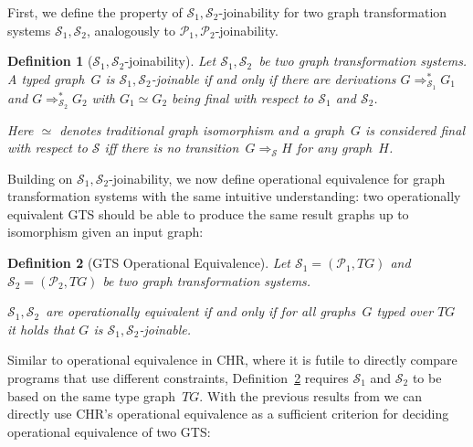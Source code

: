 \documentclass{tlp}
\newtheorem{definition}{Definition}[section]
\newcommand{\mcP}{\ensuremath{\mathcal{P}}}
\newcommand{\mcS}{\ensuremath{\mathcal{S}}}
\newcommand{\Ps}{\ensuremath{\mcP_1,\mcP_2}}
\newcommand{\Ss}{\ensuremath{\mcS_1,\mcS_2}}
\newcommand{\dergts}{\ensuremath{\Rightarrow}}
\newcommand{\iso}{\ensuremath{\simeq}}
\begin{document}
First, we define the property of \Ss-joinability for two graph transformation
systems \Ss, analogously to \Ps-joinability.

\begin{definition}[\Ss-joinability]

Let \Ss\ be two graph transformation systems. A typed graph~$G$ is
\emph{\Ss-joinable} if and only if there are derivations $G \dergts^*_{\mcS_1}
G_1$ and $G \dergts^*_{\mcS_2} G_2$ with $G_1 \iso G_2$ being final with respect
to $\mcS_1$ and $\mcS_2$. 

Here $\iso$ denotes traditional graph isomorphism and a graph~$G$ is considered
\emph{final} with respect to $\mcS$ iff there is no transition~$G \dergts_{\mcS}
H$ for any graph~$H$.
\end{definition}

Building on \Ss-joinability, we now define operational equivalence for graph
transformation systems with the same intuitive understanding: two operationally
equivalent GTS should be able to produce the same result graphs up to isomorphism
given an input graph:

\begin{definition}[GTS Operational Equivalence]\label{def:gts_oe}
Let $\mcS_1 = (\mcP_1, TG)$ and $\mcS_2 = (\mcP_2, TG)$ be two graph
transformation systems.

\Ss\ are \emph{operationally equivalent} if and only if for all graphs~$G$ typed
over $TG$ it holds that $G$ is \Ss-joinable.
\end{definition}

Similar to operational equivalence in CHR, where it is futile to directly compare
programs that use different constraints, Definition~\ref{def:gts_oe} requires
$\mcS_1$ and $\mcS_2$ to be based on the same type graph~$TG$. With the previous
results from \cite{Raiser2009} we can directly use CHR's operational equivalence
as a sufficient criterion for deciding operational equivalence of two GTS:
\end{document}
